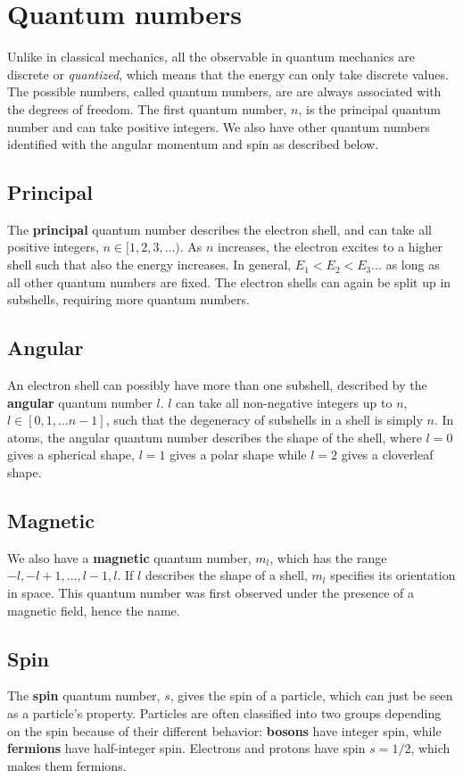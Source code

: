 \section{Quantum numbers}
Unlike in classical mechanics, all the observable in quantum mechanics are discrete or \textit{quantized}, which means that the energy can only take discrete values. The possible numbers, called quantum numbers, are are always associated with the degrees of freedom. The first quantum number, $n$, is the principal quantum number and can take positive integers. We also have other quantum numbers identified with the angular momentum and spin as described below.

\subsection*{Principal}
The \textbf{principal} quantum number describes the electron shell, and can take all positive integers, $n\in[1,2,3,\hdots)$. As $n$ increases, the electron excites to a higher shell such that also the energy increases. In general, $E_1<E_2<E_3\hdots$ as long as all other quantum numbers are fixed. The electron shells can again be split up in subshells, requiring more quantum numbers.

\subsection*{Angular}
An electron shell can possibly have more than one subshell, described by the \textbf{angular} quantum number $l$. $l$ can take all non-negative integers up to $n$, $l\in[0,1,\hdots n-1]$, such that the degeneracy of subshells in a shell is simply $n$. In atoms, the angular quantum number describes the shape of the shell, where $l=0$ gives a spherical shape, $l=1$ gives a polar shape while $l=2$ gives a cloverleaf shape. 

\subsection*{Magnetic}
We also have a \textbf{magnetic} quantum number, $m_l$, which has the range $-l,-l+1,\hdots,l-1,l$. If $l$ describes the shape of a shell, $m_l$ specifies its orientation in space. This quantum number was first observed under the presence of a magnetic field, hence the name.

\subsection*{Spin}
The \textbf{spin} quantum number, $s$, gives the spin of a particle, which can just be seen as a particle's property. Particles are often classified into two groups depending on the spin because of their different behavior: \textbf{bosons} have integer spin, while \textbf{fermions} have half-integer spin. Electrons and protons have spin $s=1/2$, which makes them fermions.


